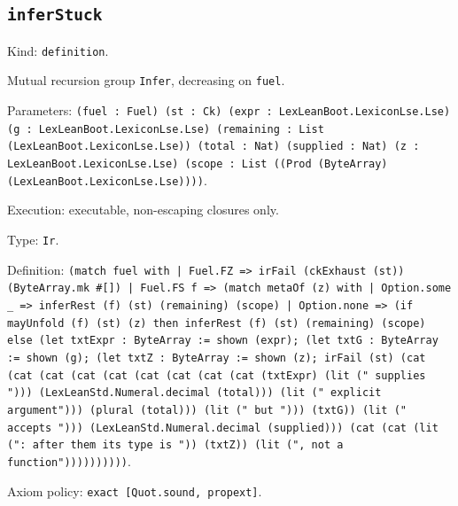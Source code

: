 \documentclass[11pt]{article}
\begin{document}
\subsection*{\texttt{inferStuck}}
\noindent Kind: \texttt{definition}.\par
\noindent Mutual recursion group \texttt{Infer}, decreasing on \texttt{fuel}.\par
\noindent Parameters: \texttt{(fuel : Fuel) (st : Ck) (expr : LexLeanBoot.LexiconLse.Lse) (g : LexLeanBoot.LexiconLse.Lse) (remaining : List (LexLeanBoot.LexiconLse.Lse)) (total : Nat) (supplied : Nat) (z : LexLeanBoot.LexiconLse.Lse) (scope : List ((Prod (ByteArray) (LexLeanBoot.LexiconLse.Lse))))}.\par
\noindent Execution: executable, non-escaping closures only.\par
\noindent Type: \texttt{Ir}.\par
\noindent Definition: \texttt{(match fuel with | Fuel.FZ => irFail (ckExhaust (st)) (ByteArray.mk \#[]) | Fuel.FS f => (match metaOf (z) with | Option.some \_ => inferRest (f) (st) (remaining) (scope) | Option.none => (if mayUnfold (f) (st) (z) then inferRest (f) (st) (remaining) (scope) else (let txtExpr : ByteArray := shown (expr); (let txtG : ByteArray := shown (g); (let txtZ : ByteArray := shown (z); irFail (st) (cat (cat (cat (cat (cat (cat (cat (cat (cat (txtExpr) (lit (" supplies "))) (LexLeanStd.Numeral.decimal (total))) (lit (" explicit argument"))) (plural (total))) (lit (" but "))) (txtG)) (lit (" accepts "))) (LexLeanStd.Numeral.decimal (supplied))) (cat (cat (lit (": after them its type is ")) (txtZ)) (lit (", not a function"))))))))))}.\par
\noindent Axiom policy: \texttt{exact [Quot.sound, propext]}.\par
\end{document}
